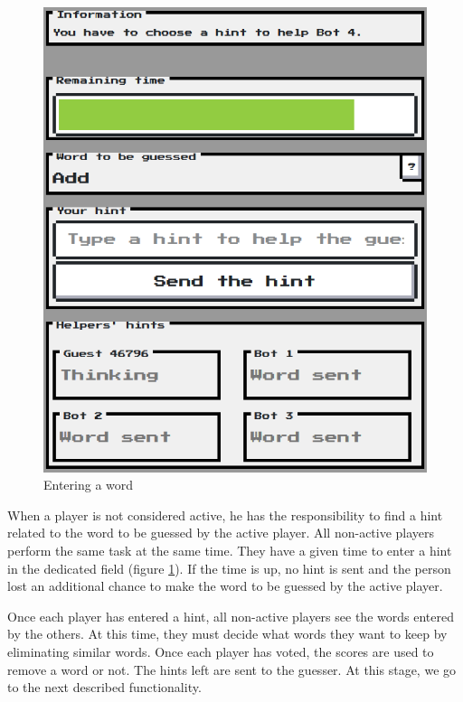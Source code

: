 \documentclass{tnreport}
\begin{document}
\begin{figure}
	\centering
	\vspace*{-0.2cm}
	\includegraphics[scale=0.4]{figures/entering_word}
	\caption{Entering a word}
	\label{fig:entering_word}
\end{figure} 

When a player is not considered active, he has the responsibility to find a hint related to the word to be guessed by the active player. All non-active players perform the same task at the same time. They have a given time to enter a hint in the dedicated field (figure \ref{fig:entering_word}). If the time is up, no hint is sent and the person lost an additional chance to make the word to be guessed by the active player. 

Once each player has entered a hint, all non-active players see the words entered by the others. At this time, they must decide what words they want to keep by eliminating similar words. Once each player has voted, the scores are used to remove a word or not. The hints left are sent to the guesser. At this stage, we go to the next described functionality. 
\end{document}
